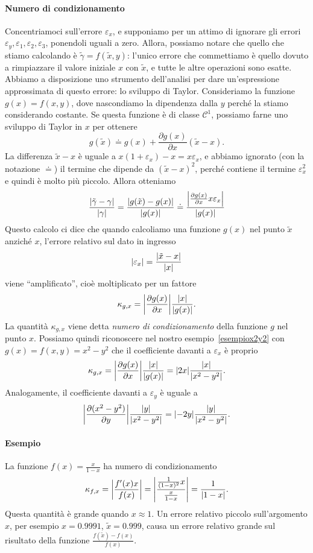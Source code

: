 \documentclass[a4paper]{report}
\DeclarePairedDelimiter{\abs}{\lvert}{\rvert}
\theoremstyle{definiton}
\theoremstyle{remark}
\begin{document}
\paragraph{Numero di condizionamento} Concentriamoci sull'errore $\varepsilon_x$, e supponiamo per un attimo di ignorare gli errori $\varepsilon_y, \varepsilon_1,\varepsilon_2,\varepsilon_3$, ponendoli uguali a zero. Allora, possiamo notare che quello che stiamo calcolando è $\tilde{\gamma} = f(\tilde{x},y)$: l'unico errore che commettiamo è quello dovuto a rimpiazzare il valore iniziale $x$ con $\tilde{x}$, e tutte le altre operazioni sono esatte. Abbiamo a disposizione uno strumento dell'analisi per dare un'espressione approssimata di questo errore: lo sviluppo di Taylor. Consideriamo la funzione $g(x) = f(x,y)$, dove nascondiamo la dipendenza dalla $y$ perché la stiamo considerando costante. Se questa funzione è di classe $\mathcal{C}^1$, possiamo farne uno sviluppo di Taylor in $x$ per ottenere
\[
g(\tilde{x}) \doteq g(x) + \frac{\partial g(x)}{\partial x} (\tilde{x}-x).
\]
La differenza $\tilde{x}-x$ è uguale a $x(1+\varepsilon_x)-x = x\varepsilon_x$, e abbiamo ignorato (con la notazione $\doteq$) il termine che dipende da $(\tilde{x}-x)^2$, perché contiene il termine $\varepsilon_x^2$ e quindi è molto più piccolo. Allora otteniamo
\[
\frac{\abs{\tilde{\gamma} - \gamma}}{\abs{\gamma}} = \frac{\abs{g(\tilde{x})-g(x)}}{\abs{g(x)}} \doteq \frac{\abs*{\frac{\partial g(x)}{\partial x} x\varepsilon_x}}{\abs{g(x)}}
\]
Questo calcolo ci dice che quando calcoliamo una funzione $g(x)$ nel punto $\tilde{x}$ anziché $x$, l'errore relativo sul dato in ingresso
\[
\abs{\varepsilon_x} = \frac{\abs{\tilde{x}-x}}{\abs{x}}
\]
viene ``amplificato'', cioè moltiplicato per un fattore
\[
\kappa_{g,x} = \abs*{\frac{\partial g(x)}{\partial x}}\frac{\abs{x}}{\abs{g(x)}}.
\]
La quantità $\kappa_{g,x}$ viene detta \emph{numero di condizionamento} della funzione $g$ nel punto $x$. Possiamo quindi riconoscere nel nostro esempio~\eqref{esempiox2y2} con $g(x) = f(x,y) = x^2-y^2$ che il coefficiente davanti a $\varepsilon_x$ è proprio
\[
\kappa_{g,x} = \abs*{\frac{\partial g(x)}{\partial x}}\frac{\abs{x}}{\abs{g(x)}} = \abs{2x} \frac{\abs{x}}{\abs{x^2-y^2}}.
\]
Analogamente, il coefficiente davanti a $\varepsilon_y$ è uguale a 
\[
    \abs*{\frac{\partial (x^2-y^2)}{\partial y}}\frac{\abs{y}}{\abs{x^2-y^2}} = \abs{-2y} \frac{\abs{y}}{\abs{x^2-y^2}}.
\]
\paragraph{Esempio} La funzione $f(x) = \frac{x}{1-x}$ ha numero di condizionamento
\[
\kappa_{f,x} = \abs*{\frac{f'(x)x}{f(x)}} = \abs*{\frac{\frac{1}{(1-x)^2}x}{\frac{x}{1-x}}} = \frac{1}{\abs{1-x}}.
\]
Questa quantità è grande quando $x\approx 1$. Un errore relativo piccolo sull'argomento $x$, per esempio $x=0.9991$, $\tilde{x} = 0.999$, causa un errore relativo grande sul risultato della funzione $\frac{f(\tilde{x})-f(x)}{f(x)}$.
\end{document}
